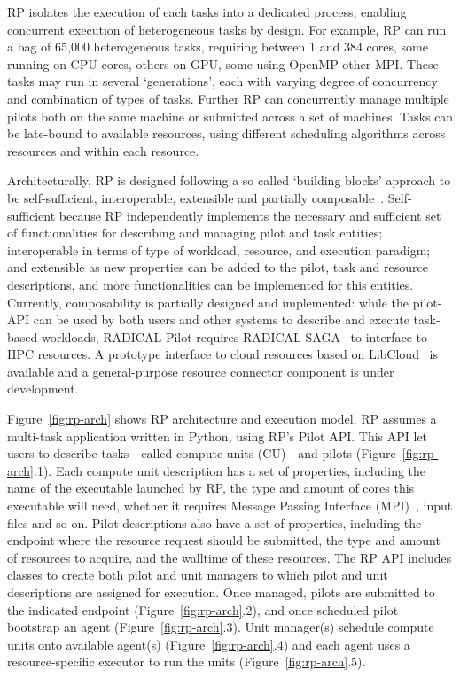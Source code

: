 \documentclass{webofc}
\begin{document}
RP isolates the execution of each tasks into a dedicated process, enabling
concurrent execution of heterogeneous tasks by design. For example, RP can
run a bag of 65,000 heterogeneous tasks, requiring between 1 and 384 cores,
some running on CPU cores, others on GPU, some using OpenMP other MPI. These
tasks may run in several ‘generations’, each with varying degree of
concurrency and combination of types of tasks. Further RP can concurrently
manage multiple pilots both on the same machine or submitted across a set of
machines. Tasks can be late-bound to available resources, using different
scheduling algorithms across resources and within each resource.
	
Architecturally, RP is designed following a so called ‘building blocks’
approach to be self-sufficient, interoperable, extensible and partially
composable~\citep{turilli2018building}. Self-sufficient because RP
independently implements the necessary and sufficient set of functionalities
for describing and managing pilot and task entities; interoperable in terms
of type of workload, resource, and execution paradigm; and extensible as new
properties can be added to the pilot, task and resource descriptions, and
more functionalities can be implemented for this entities. Currently,
composability is partially designed and implemented: while the pilot-API can
be used by both users and other systems to describe and execute task-based
workloads, RADICAL-Pilot requires
RADICAL-SAGA~\citep{goodale2006saga,merzky2015saga,radical-saga} to interface
to HPC resources. A prototype interface to cloud resources based on
LibCloud~\citep{LibCloud} is available and a general-purpose resource
connector component is under development.
	
Figure~\ref{fig:rp-arch} shows RP architecture and execution model. RP
assumes a multi-task application written in Python, using RP's Pilot API.
This API let users to describe tasks---called compute units (CU)---and pilots
(Figure~\ref{fig:rp-arch}.1). Each compute unit description has a set of
properties, including the name of the executable launched by RP, the type and
amount of cores this executable will need, whether it requires Message
Passing Interface (MPI)~\citep{gropp1999using}, input files and so on. Pilot
descriptions also have a set of properties, including the endpoint where the
resource request should be submitted, the type and amount of resources to
acquire, and the walltime of these resources. The RP API includes classes to
create both pilot and unit managers to which pilot and unit descriptions are
assigned for execution. Once managed, pilots are submitted to the indicated
endpoint (Figure~\ref{fig:rp-arch}.2), and once scheduled pilot bootstrap an
agent (Figure~\ref{fig:rp-arch}.3). Unit manager(s) schedule compute units
onto available agent(s) (Figure~\ref{fig:rp-arch}.4) and each agent uses a
resource-specific executor to run the units (Figure~\ref{fig:rp-arch}.5).
\end{document}
